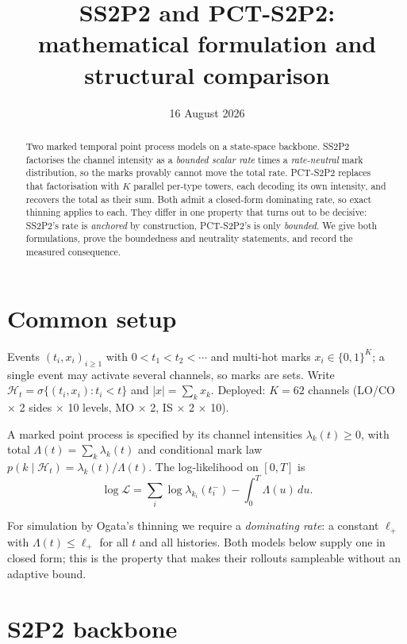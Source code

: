 \documentclass[11pt]{article}
\title{\textbf{SS2P2} and \textbf{PCT-S2P2}:\\
mathematical formulation and structural comparison}
\author{}
\date{16 August 2026}
\theoremstyle{remark}
\newcommand{\Hist}{\mathcal{H}}
\begin{document}
\maketitle

\begin{abstract}
\noindent
Two marked temporal point process models on a state-space backbone. SS2P2
factorises the channel intensity as a \emph{bounded scalar rate} times a
\emph{rate-neutral} mark distribution, so the marks provably cannot move the
total rate. PCT-S2P2 replaces that factorisation with $K$ parallel per-type
towers, each decoding its own intensity, and recovers the total as their sum.
Both admit a closed-form dominating rate, so exact thinning applies to each.
They differ in one property that turns out to be decisive: SS2P2's rate is
\emph{anchored} by construction, PCT-S2P2's is only \emph{bounded}. We give
both formulations, prove the boundedness and neutrality statements, and record
the measured consequence.
\end{abstract}

\section{Common setup}

Events $(t_i, x_i)_{i\ge1}$ with $0 < t_1 < t_2 < \cdots$ and multi-hot marks
$x_i \in \{0,1\}^K$; a single event may activate several channels, so marks are
sets. Write $\Hist_t = \sigma\{(t_i,x_i) : t_i < t\}$ and $|x| = \sum_k x_k$.
Deployed: $K = 62$ channels (LO/CO $\times$ 2 sides $\times$ 10 levels, MO
$\times$ 2, IS $\times$ 2 $\times$ 10).

A marked point process is specified by its channel intensities
$\lambda_k(t) \ge 0$, with total $\Lambda(t) = \sum_k \lambda_k(t)$ and
conditional mark law $p(k \mid \Hist_t) = \lambda_k(t)/\Lambda(t)$.
The log-likelihood on $[0,T]$ is
\begin{equation}
\log\mathcal{L}
= \sum_i \log \lambda_{k_i}(t_i^-) - \int_0^T \Lambda(u)\,du .
\label{eq:ll}
\end{equation}

For simulation by Ogata's thinning we require a \emph{dominating rate}: a
constant $\ell_+$ with $\Lambda(t) \le \ell_+$ for all $t$ and all histories.
Both models below supply one in closed form; this is the property that makes
their rollouts sampleable without an adaptive bound.

\section{S2P2 backbone}
\end{document}
